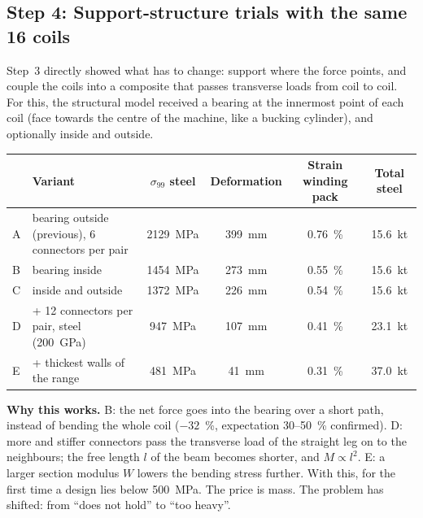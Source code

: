 \subsection*{Step 4: Support-structure trials with the same 16 coils}
Step~3 directly showed what has to change: support where the force points, and couple the coils into a composite that
passes transverse loads from coil to coil. For this, the structural model received a bearing at the innermost point of
each coil (face towards the centre of the machine, like a bucking cylinder), and optionally inside and outside.


\begin{center}\small
\begin{tabular}{llcccc}
\toprule
 & Variant & $\sigma_{99}$ steel & Deformation & Strain winding pack & Total steel \\
\midrule
A & bearing outside (previous), 6 connectors per pair & \SI{2129}{MPa} & \SI{399}{mm} & 0.76~\% & \SI{15.6}{kt} \\
B & bearing inside & \SI{1454}{MPa} & \SI{273}{mm} & 0.55~\% & \SI{15.6}{kt} \\
C & inside and outside & \SI{1372}{MPa} & \SI{226}{mm} & 0.54~\% & \SI{15.6}{kt} \\
D & + 12 connectors per pair, steel (200~GPa) & \SI{947}{MPa} & \SI{107}{mm} & 0.41~\% & \SI{23.1}{kt} \\
E & + thickest walls of the range & \SI{481}{MPa} & \SI{41}{mm} & 0.31~\% & \SI{37.0}{kt} \\
\bottomrule
\end{tabular}
\end{center}
\textbf{Why this works.} B: the net force goes into the bearing over a short path, instead of bending the whole coil
($-32$~\%, expectation 30--50~\% confirmed). D: more and stiffer connectors pass the transverse load of the straight leg
on to the neighbours; the free length $l$ of the beam becomes shorter, and $M \propto l^2$. E: a larger section modulus
$W$ lowers the bending stress further. With this, for the first time a design lies below \SI{500}{MPa}. The price is
mass. The problem has shifted: from “does not hold” to “too heavy”.

